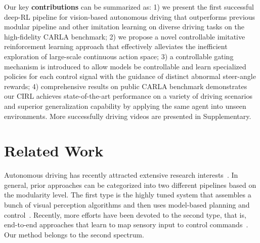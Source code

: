 \documentclass[runningheads]{llncs}
\begin{document}
Our key \textbf{contributions} can be summarized as: 1) we present the first successful deep-RL pipeline for vision-based autonomous driving that outperforms previous modular pipeline and other imitation learning on diverse driving tasks on the high-fidelity CARLA benchmark; 2) we propose a novel controllable imitative reinforcement learning approach that effectively alleviates the inefficient exploration of large-scale continuous action space; 3) a controllable gating mechanism is introduced to allow models be controllable and learn specialized policies for each control signal with the guidance of distinct abnormal steer-angle rewards; 4) comprehensive results on public CARLA benchmark demonstrates our CIRL achieves state-of-the-art performance on a variety of driving scenarios and superior generalization capability by applying the same agent into unseen environments. More successfully driving videos are presented in Supplementary.


\section{Related Work}

Autonomous driving has recently attracted extensive research interests~\cite{paden2016survey}. In general, prior approaches can be categorized into two different pipelines based on the modularity level. The first type is the  highly tuned system that assembles a bunch of visual perception algorithms and then uses model-based planning and control~\cite{book}. Recently, more efforts have been devoted to the second type, that is, end-to-end approaches that learn to map sensory input to
control commands~\cite{xu2017end,bojarski2016end,pomerleau1989alvinn,zhang2017query,codevilla2017end,yang2018unsupervised}. Our method belongs to the second spectrum. 
\end{document}
